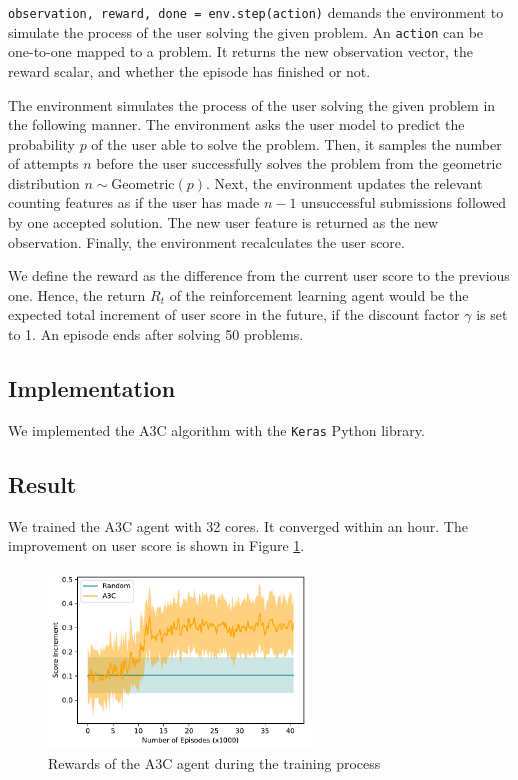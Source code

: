        \verb|observation, reward, done = env.step(action)|
        demands the environment to simulate the process of the user solving the given problem.
        An \verb|action| can be one-to-one mapped to a problem.
        It returns the new observation vector, the reward scalar, and whether the episode has finished or not.

        The environment simulates the process of the user solving the given problem in the following manner.
        The environment asks the user model to predict the probability $p$ of the user able to solve the problem.
        Then, it samples the number of attempts $n$ before the user successfully solves the problem
        from the geometric distribution $n \sim \mathrm{Geometric}(p)$.
        Next, the environment updates the relevant counting features
        as if the user has made $n-1$ unsuccessful submissions followed by one accepted solution.
        The new user feature is returned as the new observation.
        Finally, the environment recalculates the user score.

        We define the reward as the difference from the current user score to the previous one.
        Hence, the return $R_t$ of the reinforcement learning agent
        would be the expected total increment of user score in the future,
        if the discount factor $\gamma$ is set to 1.
        An episode ends after solving 50 problems.

    \subsection{Implementation}

        We implemented the A3C algorithm with the \verb|Keras|\cite{chollet2015keras} Python library.

    \subsection{Result}

        We trained the A3C agent with 32 cores.
        It converged within an hour.
        The improvement on user score is shown in Figure \ref{fig:a3c-episode-reward}.
        \begin{figure}[!htp]
            \centering
            \includegraphics[width=0.62\textwidth]{img/a3c-episode-reward.pdf}
            \caption{Rewards of the A3C agent during the training process}
            \label{fig:a3c-episode-reward}
        \end{figure}









